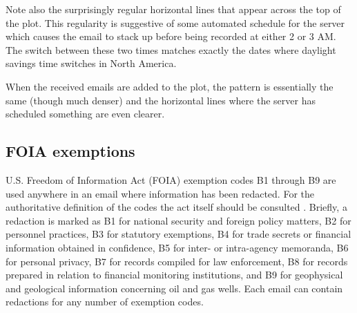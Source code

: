 \documentclass[journal]{vgtc}                %
\begin{document}
Note also the surprisingly regular horizontal lines that appear across the top of the plot.  This regularity is suggestive of some automated schedule for the server which causes the email to stack up before being recorded at either 2 or 3 AM.  The switch between these two times matches exactly the dates where daylight savings time switches in North America.  

When the received emails are added to the plot, the pattern is essentially the same (though much denser) and the horizontal lines where the server has scheduled something are even clearer.

\subsection{FOIA exemptions}
\label{sect:Displays:FOIA}
U.S. Freedom of Information Act (FOIA) exemption codes B1 through B9 are used anywhere in an email where information has been redacted.  For the authoritative definition of the codes the act itself should be consulted \cite{FOIA}.  Briefly, a redaction is marked as B1 for national security and foreign policy matters,  B2 for personnel practices, B3 for statutory exemptions,  B4 for trade secrets or financial information obtained in confidence,  B5 for inter- or intra-agency memoranda,  B6 for personal privacy,  B7 for records compiled for law enforcement,  B8 for records prepared in relation to financial monitoring institutions, and B9 for geophysical and geological information concerning oil and gas wells.   Each email can contain redactions for any number of exemption codes.
\end{document}
